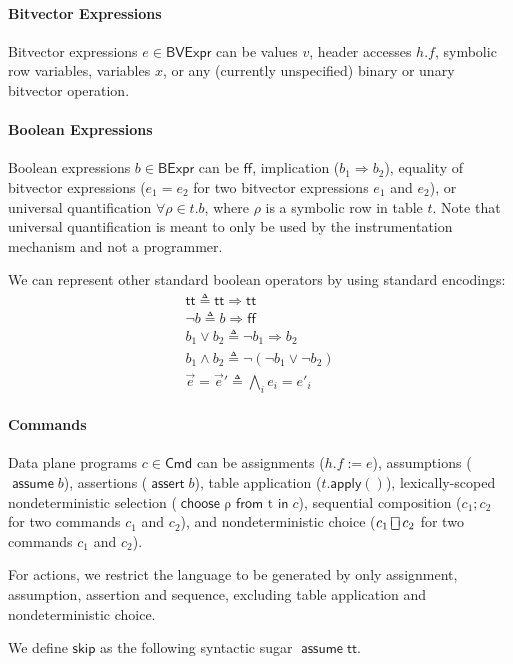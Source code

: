 \documentclass{article}
\newcommand{\TRUE}{\mathsf{tt}}
\newcommand{\FALSE}{\mathsf{ff}}
\newcommand{\BVExpr}{\mathsf{BVExpr}}
\newcommand{\BExpr}{\mathsf{BExpr}}
\newcommand{\assert}{\mathop{\mathsf{assert}}}
\newcommand{\assume}{\mathop{\mathsf{assume}}}
\newcommand{\apply}{\mathsf{apply}}
\newcommand{\choiceop}{\rotatebox[origin=c]{90}{$\sqsubset\!\!\!\sqsupset$}}
\newcommand{\choice}{\mathbin{\choiceop}}
\renewcommand{\choose}[2]{\mathop{\mathsf{choose}~#1~\mathsf{from}~#2~\mathsf{in}}}
\newcommand{\SKIP}{\mathsf{skip}}
\begin{document}
\paragraph{Bitvector Expressions}
Bitvector expressions $e \in \BVExpr$ can be values $v$, header accesses $h.f$,
symbolic row variables, variables $x$, or any
(currently unspecified) binary or unary bitvector operation.

\paragraph{Boolean Expressions}
Boolean expressions $b \in \BExpr$ can be $\FALSE$, implication ($b_1
\Rightarrow b_2$), equality of bitvector expressions ($e_1 = e_2$ for two
bitvector expressions $e_1$ and $e_2$), or universal quantification $\forall
\rho \in t. b$, where $\rho$ is a symbolic row in table $t$. Note that universal
quantification is meant to only be used by the instrumentation mechanism and not
a programmer.

We can represent other standard boolean operators by using standard encodings:
\[\begin{array}{l}
  \TRUE \triangleq \TRUE \Rightarrow \TRUE \\
  \neg b \triangleq b \Rightarrow \FALSE \\
  b_1 \vee b_2 \triangleq \neg b_1 \Rightarrow b_2 \\
  b_1 \wedge b_2 \triangleq \neg(\neg b_1 \vee \neg b_2) \\
  \vec e = \vec e' \triangleq \bigwedge_i e_i = e'_i
\end{array}\]

\paragraph{Commands}
Data plane programs $c \in \mathsf{Cmd}$ can be assignments ($h.f := e$),
assumptions ($\assume b$), assertions ($\assert b$), table application
($t.\apply()$), lexically-scoped nondeterministic selection ($\choose \rho t c$), sequential composition ($c_1;c_2$ for two commands $c_1$ and
$c_2$), and nondeterministic choice ($c_1 \choice c_2$ for two commands $c_1$
and $c_2$).

For actions, we restrict the language to be generated by only assignment, assumption, assertion and sequence, excluding table application and nondeterministic choice.

We define $\SKIP$ as the following syntactic sugar $\assume \TRUE$.
\end{document}
